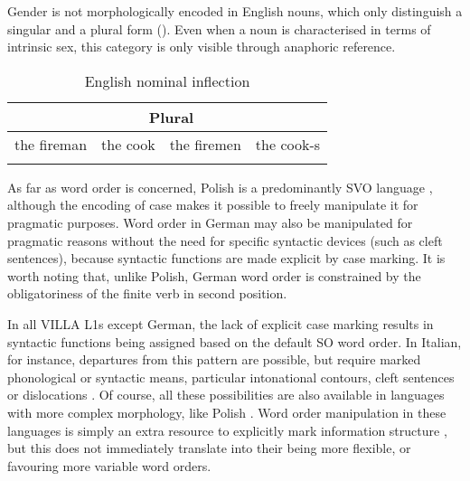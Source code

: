 Gender is not morphologically encoded in English nouns, which only distinguish a singular and a plural form (). Even when a noun is characterised in terms of intrinsic sex, this category is only visible through anaphoric reference.

\begin{table}
    \begin{tabularx}{\textwidth}{lXll}
    \lsptoprule
        \multicolumn{2}{c}{Singular} & \multicolumn{2}{c}{Plural}\\
    \midrule
        {the} {fireman} & {the} {cook} & {the} {firemen} & {the} {cook-s}\\
\lspbottomrule
    \end{tabularx}
    \caption{English nominal inflection}
    \label{tab:02:6}
\end{table}


As far as word order is concerned, Polish is a predominantly SVO language \citep{rothstein_polish_2002, Dryer2013a}, although the encoding of case makes it possible to freely manipulate it for pragmatic purposes. Word order in German may also be manipulated for pragmatic reasons without the need for specific syntactic devices (such as cleft sentences), because syntactic functions are made explicit by case marking. It is worth noting that, unlike Polish, German word order is constrained by the obligatoriness of the finite verb in second position.

In all VILLA L1s except German, the lack of explicit case marking results in syntactic functions being assigned based on the default SO word order. In Italian, for instance, departures from this pattern  are possible, but require marked phonological or syntactic means, particular intonational contours, cleft sentences  or dislocations . Of course, all these possibilities are also available in languages with more complex morphology, like Polish . Word order manipulation in these languages is simply an extra resource to explicitly mark information structure , but this does not immediately translate into their being more flexible, or favouring more variable word orders. 

